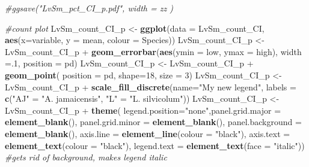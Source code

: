 \documentclass[]{article}
\newenvironment{Shaded}{\begin{snugshade}}{\end{snugshade}}
\newcommand{\KeywordTok}[1]{\textcolor[rgb]{0.13,0.29,0.53}{\textbf{{#1}}}}
\newcommand{\DataTypeTok}[1]{\textcolor[rgb]{0.13,0.29,0.53}{{#1}}}
\newcommand{\DecValTok}[1]{\textcolor[rgb]{0.00,0.00,0.81}{{#1}}}
\newcommand{\StringTok}[1]{\textcolor[rgb]{0.31,0.60,0.02}{{#1}}}
\newcommand{\CommentTok}[1]{\textcolor[rgb]{0.56,0.35,0.01}{\textit{{#1}}}}
\newcommand{\NormalTok}[1]{{#1}}
\begin{document}
\begin{Shaded}
\begin{Highlighting}[]
\CommentTok{#ggsave("LvSm_pct_CI_p.pdf", width = zz  )}

\CommentTok{#count plot}
\NormalTok{LvSm_count_CI_p <-}\StringTok{ }\KeywordTok{ggplot}\NormalTok{(}\DataTypeTok{data =} \NormalTok{LvSm_count_CI, }\KeywordTok{aes}\NormalTok{(}\DataTypeTok{x=}\NormalTok{variable, }\DataTypeTok{y =} \NormalTok{mean, }\DataTypeTok{colour =} \NormalTok{Species))}
\NormalTok{LvSm_count_CI_p <-}\StringTok{ }\NormalTok{LvSm_count_CI_p +}\StringTok{ }\KeywordTok{geom_errorbar}\NormalTok{(}\KeywordTok{aes}\NormalTok{(}\DataTypeTok{ymin =} \NormalTok{low, }\DataTypeTok{ymax =} \NormalTok{high), }\DataTypeTok{width =}\NormalTok{.}\DecValTok{1}\NormalTok{, }\DataTypeTok{position =} \NormalTok{pd)}
\NormalTok{LvSm_count_CI_p <-}\StringTok{ }\NormalTok{LvSm_count_CI_p +}\StringTok{ }\KeywordTok{geom_point}\NormalTok{( }\DataTypeTok{position =} \NormalTok{pd, }\DataTypeTok{shape=}\DecValTok{18}\NormalTok{, }\DataTypeTok{size =} \DecValTok{3}\NormalTok{)}
\NormalTok{LvSm_count_CI_p <-}\StringTok{ }\NormalTok{LvSm_count_CI_p +}\StringTok{ }\KeywordTok{scale_fill_discrete}\NormalTok{(}\DataTypeTok{name=}\StringTok{"My new legend"}\NormalTok{, }\DataTypeTok{labels =} \KeywordTok{c}\NormalTok{(}\StringTok{"AJ"} \NormalTok{=}\StringTok{ "A. jamaicensis"}\NormalTok{, }\StringTok{"L"} \NormalTok{=}\StringTok{ "L. silvicolum"}\NormalTok{)) }
\NormalTok{LvSm_count_CI_p <-}\StringTok{ }\NormalTok{LvSm_count_CI_p +}\StringTok{  }\KeywordTok{theme}\NormalTok{( }\DataTypeTok{legend.position=}\StringTok{"none"}\NormalTok{,}\DataTypeTok{panel.grid.major =} \KeywordTok{element_blank}\NormalTok{(), }\DataTypeTok{panel.grid.minor =} \KeywordTok{element_blank}\NormalTok{(),}
\DataTypeTok{panel.background =} \KeywordTok{element_blank}\NormalTok{(), }\DataTypeTok{axis.line =} \KeywordTok{element_line}\NormalTok{(}\DataTypeTok{colour =} \StringTok{"black"}\NormalTok{), }\DataTypeTok{axis.text =} \KeywordTok{element_text}\NormalTok{(}\DataTypeTok{colour =} \StringTok{"black"}\NormalTok{), }\DataTypeTok{legend.text =} \KeywordTok{element_text}\NormalTok{(}\DataTypeTok{face =} \StringTok{"italic"}\NormalTok{))  }\CommentTok{#gets rid of background, makes legend italic}


\end{Highlighting}
\end{Shaded}
\end{document}

